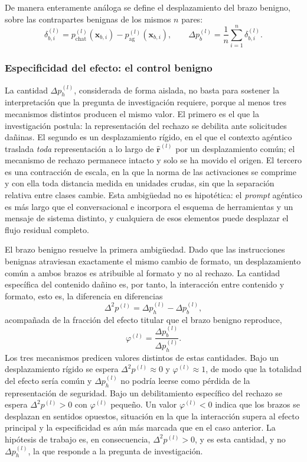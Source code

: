 \documentclass[12pt,a4paper]{article}
\begin{document}
De manera enteramente análoga se define el desplazamiento del brazo benigno, sobre las contrapartes benignas de los mismos $n$ pares:
\[
\delta_{b,i}^{(l)} = p^{(l)}_{\text{chat}}(\bm{x}_{b,i}) - p^{(l)}_{\text{ag}}(\bm{x}_{b,i}),
\qquad
\Delta p_{b}^{(l)} = \frac{1}{n} \sum_{i=1}^{n} \delta_{b,i}^{(l)}.
\]

\subsubsection*{Especificidad del efecto: el control benigno}

La cantidad $\Delta p_{h}^{(l)}$, considerada de forma aislada, no basta para sostener la interpretación que la pregunta de investigación requiere, porque al menos tres mecanismos distintos producen el mismo valor. El primero es el que la investigación postula: la representación del rechazo se debilita ante solicitudes dañinas. El segundo es un desplazamiento rígido, en el que el contexto agéntico traslada \textit{toda} representación a lo largo de $\hat{\bm{r}}^{(l)}$ por un desplazamiento común; el mecanismo de rechazo permanece intacto y solo se ha movido el origen. El tercero es una contracción de escala, en la que la norma de las activaciones se comprime y con ella toda distancia medida en unidades crudas, sin que la separación relativa entre clases cambie. Esta ambigüedad no es hipotética: el \textit{prompt} agéntico es más largo que el conversacional e incorpora el esquema de herramientas y un mensaje de sistema distinto, y cualquiera de esos elementos puede desplazar el flujo residual completo.

El brazo benigno resuelve la primera ambigüedad. Dado que las instrucciones benignas atraviesan exactamente el mismo cambio de formato, un desplazamiento común a ambos brazos es atribuible al formato y no al rechazo. La cantidad específica del contenido dañino es, por tanto, la interacción entre contenido y formato, esto es, la diferencia en diferencias
\[
\Delta^{2} p^{(l)} = \Delta p_{h}^{(l)} - \Delta p_{b}^{(l)},
\]
acompañada de la fracción del efecto titular que el brazo benigno reproduce,
\[
\varphi^{(l)} = \frac{\Delta p_{b}^{(l)}}{\Delta p_{h}^{(l)}}.
\]
Los tres mecanismos predicen valores distintos de estas cantidades. Bajo un desplazamiento rígido se espera $\Delta^{2} p^{(l)} \approx 0$ y $\varphi^{(l)} \approx 1$, de modo que la totalidad del efecto sería común y $\Delta p_{h}^{(l)}$ no podría leerse como pérdida de la representación de seguridad. Bajo un debilitamiento específico del rechazo se espera $\Delta^{2} p^{(l)} > 0$ con $\varphi^{(l)}$ pequeño. Un valor $\varphi^{(l)} < 0$ indica que los brazos se desplazan en sentidos opuestos, situación en la que la interacción supera al efecto principal y la especificidad es aún más marcada que en el caso anterior. La hipótesis de trabajo es, en consecuencia, $\Delta^{2} p^{(l)} > 0$, y es esta cantidad, y no $\Delta p_{h}^{(l)}$, la que responde a la pregunta de investigación.
\end{document}
